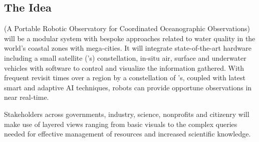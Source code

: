 \documentclass[12pt]{article}
\begin{document}
\subsection{The Idea}

\pro (A Portable Robotic Observatory for Coordinated Oceanographic
Observations) will be a modular system with bespoke approaches related
to water quality in the world's coastal zones with mega-cities. It
will integrate state-of-the-art hardware including a small satellite
(\smle's) constellation, in-situ air, surface and underwater vehicles
with software to control and visualize the information gathered. With
frequent revisit times over a region by a constellation of \smle's,
coupled with latest smart and adaptive AI techniques, robots can
provide opportune observations in near real-time.




Stakeholders across governments, industry, science, nonprofits and
citizenry will make use of layered views ranging from basic visuals to
the complex queries needed for effective management of resources and
increased scientific knowledge.
\end{document}
